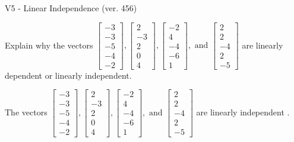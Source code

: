 \begin{exercise}
  \begin{exerciseTitle}V5 - Linear Independence (ver. 456)\end{exerciseTitle}
  \begin{exerciseStatement}
    Explain why the vectors \(\left[\begin{array}{r}
-3 \\
-3 \\
-5 \\
-4 \\
-2
\end{array}\right] , \left[\begin{array}{r}
2 \\
-3 \\
2 \\
0 \\
4
\end{array}\right] , \left[\begin{array}{r}
-2 \\
4 \\
-4 \\
-6 \\
1
\end{array}\right] , \text{ and } \left[\begin{array}{r}
2 \\
2 \\
-4 \\
2 \\
-5
\end{array}\right]\) are linearly dependent or linearly independent.	


  \end{exerciseStatement}
  \begin{exerciseAnswer}
   The vectors \(\left[\begin{array}{r}
-3 \\
-3 \\
-5 \\
-4 \\
-2
\end{array}\right] , \left[\begin{array}{r}
2 \\
-3 \\
2 \\
0 \\
4
\end{array}\right] , \left[\begin{array}{r}
-2 \\
4 \\
-4 \\
-6 \\
1
\end{array}\right] , \text{ and } \left[\begin{array}{r}
2 \\
2 \\
-4 \\
2 \\
-5
\end{array}\right]\) are 
  	 linearly independent  .
  


  \end{exerciseAnswer}
\end{exercise}